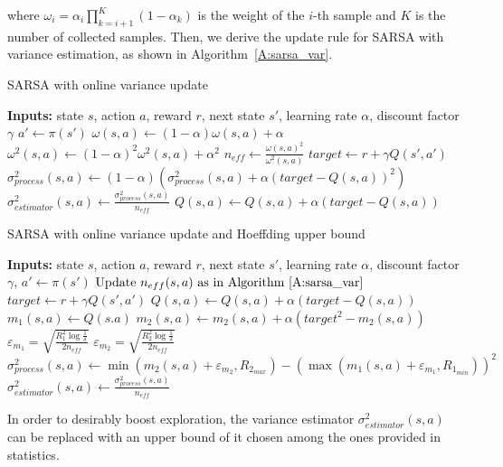 where $\omega_i = \alpha_i\prod_{k=i+1}^K{(1-\alpha_k)}$ is the weight of the $i$-th sample and $K$ is the number of collected samples.
Then, we derive the update rule for SARSA with variance estimation, as shown in Algorithm~\ref{A:sarsa_var}.
\begin{algorithm}[t]
\caption{SARSA with online variance update}
\begin{algorithmic}[1]\label{A:sarsa_var}
  \STATE \textbf{Inputs:} state $s$, action $a$, reward $r$, next state $s'$, learning rate $\alpha$, discount factor $\gamma$
  \STATE $a' \gets \pi(s')$
  \STATE $\omega (s,a) \gets (1 - \alpha) \omega (s,a) + \alpha$
  \STATE $\omega^2 (s,a) \gets (1 - \alpha)^2 \omega^2 (s,a) + \alpha ^2$
  \STATE $n_{eff} \gets \frac{\omega(s,a)^2}{\omega^2(s,a)} $
  \STATE $target \gets r + \gamma Q(s',a')$
  \STATE $\sigma^2_{process}(s,a) \gets (1 - \alpha)\left(\sigma^2_{process}(s,a) + \alpha (target - Q(s,a))^2\right)$
  \STATE $\sigma^2_{estimator}(s,a) \gets \frac{\sigma ^2_{process}(s,a)}{n_{eff}}$
  \STATE $Q(s,a) \gets Q(s,a) + \alpha \left(target - Q(s,a)\right)$
\end{algorithmic}
\end{algorithm}
\begin{algorithm}
\caption{SARSA with online variance update and Hoeffding upper bound}
\begin{algorithmic}[1]\label{A:sarsa_hoeff}
  \STATE \textbf{Inputs:} state $s$, action $a$, reward $r$, next state $s'$, learning rate $\alpha$, discount factor $\gamma$, 
  \STATE $a' \gets \pi(s')$
  \STATE $\text{Update } n_{eff}(s,a) \text{ as in Algorithm~\ref{A:sarsa_var}}$
  \STATE $target \gets r + \gamma Q(s',a')$
  \STATE $Q(s,a) \gets Q(s,a) + \alpha (target - Q(s,a))$
  \STATE $m_1(s,a) \gets Q(s.a)$
  \STATE $m_2(s,a) \gets m_2(s,a) + \alpha \left(target^2 - m_2(s,a)\right)$
  \STATE $\varepsilon_{m_1} = \sqrt{\frac{R_1^2\log{\frac{1}{\delta}}}{2n_{eff}}}$ 
  \STATE $\varepsilon_{m_2} = \sqrt{\frac{R_2^2\log{\frac{1}{\delta}}}{2n_{eff}}}$
  \STATE $\sigma^2_{process}(s,a) \gets \min(m_2(s,a) + \varepsilon_{m_2}, R_{2_{max}}) - \left(\max(m_1(s,a) + \varepsilon_{m_1}, R_{1_{min}})\right)^2$
  \STATE $\sigma^2_{estimator}(s,a) \gets \frac{\sigma ^2_{process}(s,a)}{n_{eff}}$
\end{algorithmic}
\end{algorithm}
In order to desirably boost exploration, the variance estimator $\sigma^2_{estimator}(s,a)$ can be replaced with an upper bound of it chosen among the ones provided in statistics.
